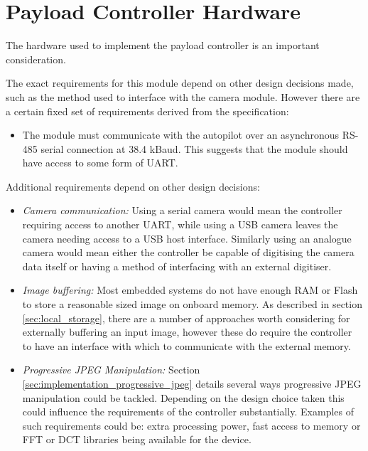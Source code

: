 \section{Payload Controller Hardware}
The hardware used to implement the payload controller is an important consideration.

The exact requirements for this module depend on other design decisions made, such as the method used to interface with the camera module. However there are a certain fixed set of requirements derived from the specification:

\begin{itemize}
\item The module must communicate with the autopilot over an asynchronous RS-485 serial connection at 38.4 kBaud. This suggests that the module should have access to some form of UART.
\end{itemize}

Additional requirements depend on other design decisions:

\begin{itemize}
\item \emph{Camera communication:} Using a serial camera would mean the controller requiring access to another UART, while using a USB camera leaves the camera needing access to a USB host interface. Similarly using an analogue camera would mean either the controller be capable of digitising the camera data itself or having a method of interfacing with an external digitiser.
 
\item \emph{Image buffering:} Most embedded systems do not have enough RAM or Flash to store a reasonable sized image on onboard memory. As described in section \ref{sec:local_storage}, there are a number of approaches worth considering for externally buffering an input image, however these do require the controller to have an interface with which to communicate with the external memory. 

\item \emph{Progressive JPEG Manipulation:} Section \ref{sec:implementation_progressive_jpeg} details several ways progressive JPEG manipulation could be tackled. Depending on the design choice taken this could influence the requirements of the controller substantially. Examples of such requirements could be: extra processing power, fast access to memory or FFT or DCT libraries being available for the device.
\end{itemize}

